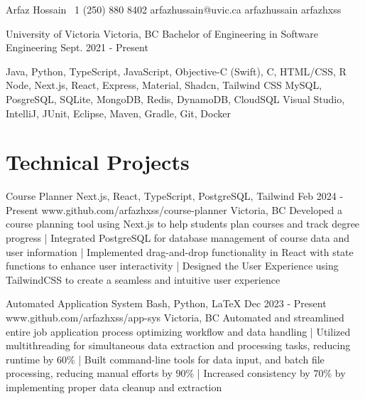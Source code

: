 \documentclass[a4paper,10pt]{article}
\begin{document}
\header
{Arfaz Hossain}				%
{\plus\ 1 (250) 880 8402}			%
{arfazhussain@uvic.ca} 			%
{arfazhussain} 				%
{arfazhxss} 				%


\education
{University of Victoria}
{Victoria, BC}
{Bachelor of Engineering in Software Engineering}
{Sept. 2021 - Present}

\technicalskills
{Java, Python, TypeScript, JavaScript, Objective-C (Swift), C\plus\plus, HTML/CSS, R}
{Node, Next.js, React, Express, Material, Shadcn, Tailwind CSS}
{MySQL, PosgreSQL, SQLite, MongoDB, Redis, DynamoDB, CloudSQL}
{Visual Studio, IntelliJ, JUnit, Eclipse, Maven, Gradle, Git, Docker}

\section{Technical Projects}
\projectentry
{Course Planner}
{Next.js, React, TypeScript, PostgreSQL, Tailwind}
{Feb 2024 - Present}
{www.github.com/arfazhxss/course-planner}
{Victoria, BC}
{Developed a course planning tool using Next.js to help students plan courses and track degree progress 
| Integrated PostgreSQL for database management of course data and user information 
| Implemented drag-and-drop functionality in React with state functions to enhance user interactivity 
| Designed the User Experience using TailwindCSS to create a seamless and intuitive user experience
}

\projectentry
{Automated Application System}
{Bash, Python, LaTeX}
{Dec 2023 - Present}
{www.github.com/arfazhxss/app-sys}
{Victoria, BC}
{Automated and streamlined entire job application process optimizing workflow and data handling
| Utilized multithreading for simultaneous data extraction and processing tasks, reducing runtime by 60\% 
| Built command-line tools for data input, and batch file processing, reducing manual efforts by 90\% 
| Increased consistency by 70\% by implementing proper data cleanup and extraction}
\end{document}
